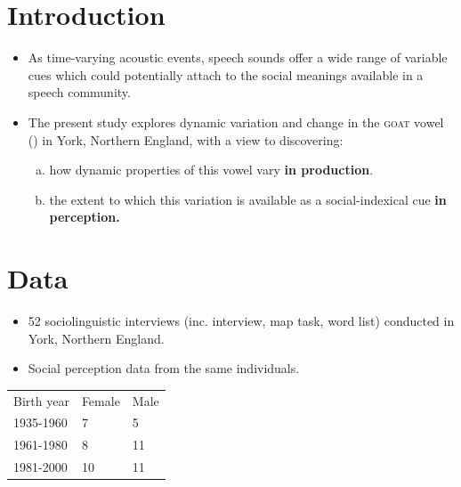 \documentclass[a0,portrait]{a0poster}
\begin{document}
\begin{multicols*}{3}							%
			\raggedcolumns			%
\section*{Introduction}
\begin{itemize}
 \item{As time-varying acoustic events, speech sounds offer a wide range of variable cues which could potentially attach to the social meanings available in a speech community.} 
 \item{The present study explores dynamic variation and change in the \textsc{goat} vowel () in York, Northern England, with a view to discovering:\vspace*{.5cm} \begin{enumerate}[(a)]\item{how dynamic properties of this vowel vary \textbf{in production}.}\vspace*{.5cm}\item{the extent to which this variation is available as a social-indexical cue \textbf{in perception.}}\end{enumerate}}
\end{itemize}
\vspace{-1cm}
\section*{Data}
\begin{itemize}
\item{52 sociolinguistic interviews (inc. interview, map task, word list) conducted in York, Northern England.}
\item{Social perception data from the same individuals.}
\end{itemize}
\vspace*{0.5cm}
\begin{table}[H]
\centering
\begin{tabular}{l|l|l}
Birth year&Female & Male \\
1935-1960 &7 &5\\
 1961-1980& 8 & 11\\
1981-2000& 10 &11\\
\end{tabular}
  \end{table}

\end{multicols*}
\end{document}
